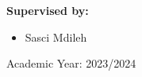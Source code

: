 \documentclass{article}
\begin{document}
\begin{center}
\begin{flushright}
\begin{minipage}[t]{0.8\textwidth}
\begin{minipage}[t]{0.48\textwidth}
		\end{minipage}%
		\hfill
		\begin{minipage}[t]{0.48\textwidth}
			\hspace*{0.5cm}
			\textbf{Supervised by:} \\[-4.7ex]
			\begin{itemize} \setlength\itemsep{0em}
				\setlength\itemsep{0em}
                \setlength{} 
                \setlength{} 
                \item \hspace*{0.3cm} Sasci Mdileh
			\end{itemize}
		\end{minipage}
		\end{minipage}
		\end{flushright}
		\vspace{5cm}
		\Large Academic Year: 2023/2024 \\
   \end{center}
\end{document}
